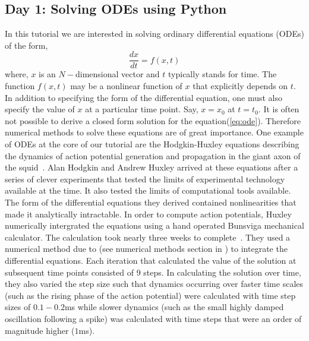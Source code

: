 \documentclass[10pt,letterpaper]{article}
\begin{document}
\begin{nolinenumbers}

\section*{Day 1: Solving ODEs using Python}
In this tutorial we are interested in solving ordinary differential equations (ODEs) of the form,
\begin{equation}
\frac{dx}{dt} = f(x, t)
\label{eq:ode}
\end{equation}
where, $x$ is an $N-$dimensional vector and $t$ typically stands for time. The function $f(x,t)$ may be a nonlinear function of $x$ that explicitly depends on $t$. In addition to specifying the form of the differential equation, one must also specify the value of $x$ at a particular time point. Say, $x=x_{0}$ at $t = t_0$. It is often not possible to derive a closed form solution for the equation(\ref{eq:ode}). Therefore numerical methods to solve these equations are of great importance. One example of ODEs at the core of our tutorial are the Hodgkin-Huxley equations describing the dynamics of action potential generation and propagation in the giant axon of the squid~\cite{Huxley1952}. Alan Hodgkin and Andrew Huxley arrived at these equations after a series of clever experiments that tested the limits of experimental technology available at the time. It also tested the limits of computational tools available. The form of the differential equations they derived contained nonlinearities that made it analytically intractable. In order to compute action potentials, Huxley numerically intergrated the equations using a hand operated Bunsviga mechanical calculator. The calculation took nearly three weeks to complete~\cite{Hodgkin1976}. They used a numerical method due to (see numerical methods section in \cite{Hodgkin1976}) to integrate the differential equations. Each iteration that calculated the value of the solution at subsequent time points consisted of 9 steps. In calculating the solution over time, they also varied the step size such that dynamics occurring over faster time scales (such as the rising phase of the action potential) were calculated with time step sizes of $0.1-0.2$ms while slower dynamics (such as the small highly damped oscillation following a spike) was calculated with time steps that were an order of magnitude higher ($1$ms).


\end{nolinenumbers}
\end{document}
